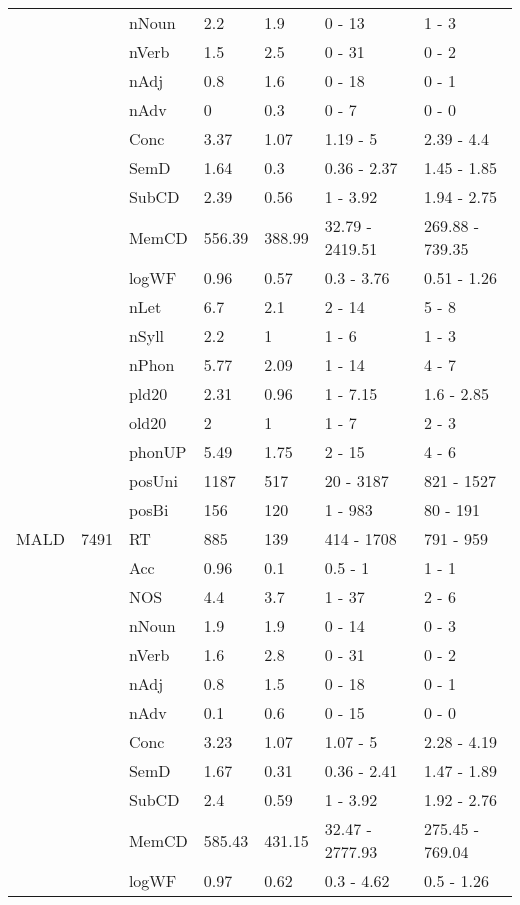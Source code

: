 \begin{table}[ht]
\begin{tabular}{lllllll}
   &  & nNoun & 2.2 & 1.9 & 0 - 13 & 1 - 3 \\ 
   &  & nVerb & 1.5 & 2.5 & 0 - 31 & 0 - 2 \\ 
   &  & nAdj & 0.8 & 1.6 & 0 - 18 & 0 - 1 \\ 
   &  & nAdv & 0 & 0.3 & 0 - 7 & 0 - 0 \\ 
   &  & Conc & 3.37 & 1.07 & 1.19 - 5 & 2.39 - 4.4 \\ 
   &  & SemD & 1.64 & 0.3 & 0.36 - 2.37 & 1.45 - 1.85 \\ 
   &  & SubCD & 2.39 & 0.56 & 1 - 3.92 & 1.94 - 2.75 \\ 
   &  & MemCD & 556.39 & 388.99 & 32.79 - 2419.51 & 269.88 - 739.35 \\ 
   &  & logWF & 0.96 & 0.57 & 0.3 - 3.76 & 0.51 - 1.26 \\ 
   &  & nLet & 6.7 & 2.1 & 2 - 14 & 5 - 8 \\ 
   &  & nSyll & 2.2 & 1 & 1 - 6 & 1 - 3 \\ 
   &  & nPhon & 5.77 & 2.09 & 1 - 14 & 4 - 7 \\ 
   &  & pld20 & 2.31 & 0.96 & 1 - 7.15 & 1.6 - 2.85 \\ 
   &  & old20 & 2 & 1 & 1 - 7 & 2 - 3 \\ 
   &  & phonUP & 5.49 & 1.75 & 2 - 15 & 4 - 6 \\ 
   &  & posUni & 1187 & 517 & 20 - 3187 & 821 - 1527 \\ 
   &  & posBi & 156 & 120 & 1 - 983 & 80 - 191 \\ 
  MALD & 7491 & RT & 885 & 139 & 414 - 1708 & 791 - 959 \\ 
   &  & Acc & 0.96 & 0.1 & 0.5 - 1 & 1 - 1 \\ 
   &  & NOS & 4.4 & 3.7 & 1 - 37 & 2 - 6 \\ 
   &  & nNoun & 1.9 & 1.9 & 0 - 14 & 0 - 3 \\ 
   &  & nVerb & 1.6 & 2.8 & 0 - 31 & 0 - 2 \\ 
   &  & nAdj & 0.8 & 1.5 & 0 - 18 & 0 - 1 \\ 
   &  & nAdv & 0.1 & 0.6 & 0 - 15 & 0 - 0 \\ 
   &  & Conc & 3.23 & 1.07 & 1.07 - 5 & 2.28 - 4.19 \\ 
   &  & SemD & 1.67 & 0.31 & 0.36 - 2.41 & 1.47 - 1.89 \\ 
   &  & SubCD & 2.4 & 0.59 & 1 - 3.92 & 1.92 - 2.76 \\ 
   &  & MemCD & 585.43 & 431.15 & 32.47 - 2777.93 & 275.45 - 769.04 \\ 
   &  & logWF & 0.97 & 0.62 & 0.3 - 4.62 & 0.5 - 1.26 \\ 

\end{tabular}
\end{table}

